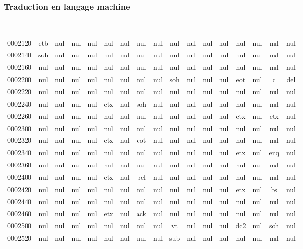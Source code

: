 \begin{frame}[fragile]
\frametitle{Traduction en langage machine}
{\tt \footnotesize
\setlength{\tabcolsep}{.07cm}
\begin{tabular}{ccccccccccccccccc}
0002120 &etb &nul &nul &nul &nul &nul &nul &nul &nul &nul &nul &nul &nul &nul &nul &nul \\
0002140 &soh &nul &nul &nul &nul &nul &nul &nul &nul &nul &nul &nul &nul &nul &nul &nul \\
0002160 &nul &nul &nul &nul &nul &nul &nul &nul &nul &nul &nul &nul &nul &nul &nul &nul \\
0002200 &nul &nul &nul &nul &nul &nul &nul &nul &soh &nul &nul &nul &eot &nul &q &del \\
0002220 &nul &nul &nul &nul &nul &nul &nul &nul &nul &nul &nul &nul &nul &nul &nul &nul \\
0002240 &nul &nul &nul &nul &etx &nul &soh &nul &nul &nul &nul &nul &nul &nul &nul &nul \\
0002260 &nul &nul &nul &nul &nul &nul &nul &nul &nul &nul &nul &nul &etx &nul &etx &nul \\
0002300 &nul &nul &nul &nul &nul &nul &nul &nul &nul &nul &nul &nul &nul &nul &nul &nul \\
0002320 &nul &nul &nul &nul &etx &nul &eot &nul &nul &nul &nul &nul &nul &nul &nul &nul \\
0002340 &nul &nul &nul &nul &nul &nul &nul &nul &nul &nul &nul &nul &etx &nul &enq &nul \\
0002360 &nul &nul &nul &nul &nul &nul &nul &nul &nul &nul &nul &nul &nul &nul &nul &nul \\
0002400 &nul &nul &nul &nul &etx &nul &bel &nul &nul &nul &nul &nul &nul &nul &nul &nul \\
0002420 &nul &nul &nul &nul &nul &nul &nul &nul &nul &nul &nul &nul &etx &nul &bs &nul \\
0002440 &nul &nul &nul &nul &nul &nul &nul &nul &nul &nul &nul &nul &nul &nul &nul &nul \\
0002460 &nul &nul &nul &nul &etx &nul &ack &nul &nul &nul &nul &nul &nul &nul &nul &nul \\
0002500 &nul &nul &nul &nul &nul &nul &nul &nul &vt &nul &nul &nul &dc2 &nul &soh &nul \\
0002520 &nul &nul &nul &nul &nul &nul &nul &nul &sub &nul &nul &nul &nul &nul &nul &nul \\
\end{tabular}}
\end{frame}

